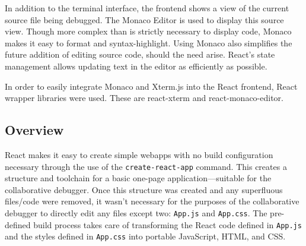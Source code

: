 \documentclass[12pt]{article}
\begin{document}
In addition to the terminal interface, the frontend shows a view of
the current source file being debugged.  The Monaco Editor
\cite{monaco} is used to display this source view.  Though more
complex than is strictly necessary to display code, Monaco makes it
easy to format and syntax-highlight.  Using Monaco also simplifies the
future addition of editing source code, should the need arise.
React's state management allows updating text in the editor as
efficiently as possible.

In order to easily integrate Monaco and Xterm.js into the React
frontend, React wrapper libraries were used.  These are
react-xterm\cite{reactxterm} and
react-monaco-editor\cite{reactmonaco}.

\subsection{Overview}






React makes it easy to create simple webapps with no build
configuration necessary through the use of the
\lstinline{create-react-app} command.  This creates a structure and
toolchain for a basic one-page application---suitable for the
collaborative debugger.  Once this structure was created and any
superfluous files/code were removed, it wasn't necessary for the
purposes of the collaborative debugger to directly edit any files
except two: \lstinline{App.js} and \lstinline{App.css}.  The
pre-defined build process takes care of transforming the React code
defined in \lstinline{App.js} and the styles defined in
\lstinline{App.css} into portable JavaScript, HTML, and CSS.
\par
\end{document}
